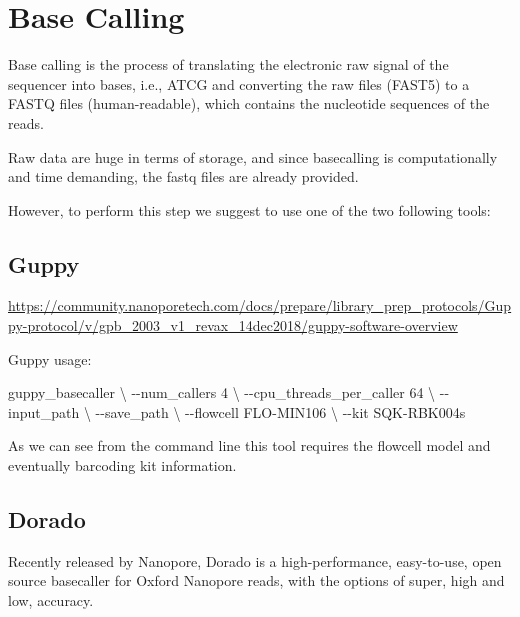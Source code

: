 \documentclass[
]{book}
\newenvironment{Shaded}{\begin{snugshade}}{\end{snugshade}}
\newcommand{\AttributeTok}[1]{\textcolor[rgb]{0.13,0.29,0.53}{#1}}
\newcommand{\DataTypeTok}[1]{\textcolor[rgb]{0.13,0.29,0.53}{#1}}
\newcommand{\ExtensionTok}[1]{#1}
\newcommand{\NormalTok}[1]{#1}
\begin{document}
\section{Base Calling}\label{base-calling}

Base calling is the process of translating the electronic raw signal of the sequencer into bases, i.e., ATCG and converting the raw files (FAST5) to a FASTQ files (human-readable), which contains the nucleotide sequences of the reads.

Raw data are huge in terms of storage, and since basecalling is computationally and time demanding, the fastq files are already provided.

However, to perform this step we suggest to use one of the two following tools:

\subsection{Guppy}\label{guppy}

\url{https://community.nanoporetech.com/docs/prepare/library_prep_protocols/Guppy-protocol/v/gpb_2003_v1_revax_14dec2018/guppy-software-overview}

Guppy usage:

\begin{Shaded}
\begin{Highlighting}[]
\ExtensionTok{guppy\_basecaller} \DataTypeTok{\textbackslash{}}
  \AttributeTok{{-}{-}num\_callers}\NormalTok{ 4 }\DataTypeTok{\textbackslash{}}
  \AttributeTok{{-}{-}cpu\_threads\_per\_caller}\NormalTok{ 64 }\DataTypeTok{\textbackslash{}}
  \AttributeTok{{-}{-}input\_path} \DataTypeTok{\textbackslash{}}
  \AttributeTok{{-}{-}save\_path} \DataTypeTok{\textbackslash{}}
  \AttributeTok{{-}{-}flowcell}\NormalTok{ FLO{-}MIN106 }\DataTypeTok{\textbackslash{}}
  \AttributeTok{{-}{-}kit}\NormalTok{ SQK{-}RBK004s}
\end{Highlighting}
\end{Shaded}

As we can see from the command line this tool requires the flowcell model and eventually barcoding kit information.

\subsection{Dorado}\label{dorado}

Recently released by Nanopore, Dorado is a high-performance, easy-to-use, open source basecaller for Oxford Nanopore reads, with the options of super, high and low, accuracy.
\end{document}
